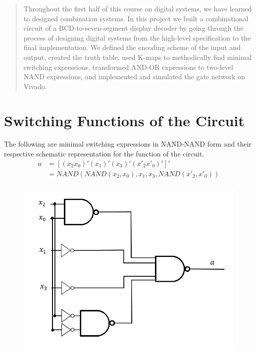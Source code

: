 \documentclass{article}
\begin{document}
\begin{abstract}
Throughout the first half of this course on digital systems, we have learned 
to designed combination systems. In this project we built a combinational 
circuit of a BCD-to-seven-segment display decoder by going through the process 
of designing digital systems from the high-level specification to the final 
implementation.  We defined the encoding scheme of the input and output, 
created the truth table, used K-maps to methodically find minimal switching 
expressions, transformed AND-OR expressions to two-level NAND expressions, 
and implemented and simulated the gate network on Vivado.
\end{abstract}


\section{Switching Functions of the Circuit}
The following are minimal switching expressions in NAND-NAND form and their 
respective schematic representation for the function of the circuit.\\

\begin{equation*}
\begin{split}
a & = [ (x_2 x_0)'  (x_1)'  (x_3)'  (x'_2 x'_0)']' \\
  & = NAND(NAND(x_2, x_0), x_1, x_3, NAND(x'_2, x'_0)) \\
\end{split}
\end{equation*}
\begin{figure}[h!]
\centering
\includegraphics[scale=0.25]{a-NAND-NAND}
\end{figure}
\end{document}
